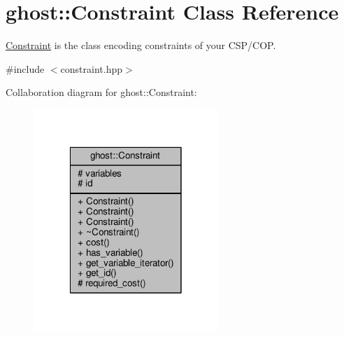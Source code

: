 \hypertarget{classghost_1_1Constraint}{\section{ghost\-:\-:Constraint Class Reference}
\label{classghost_1_1Constraint}
}


\hyperlink{classghost_1_1Constraint}{Constraint} is the class encoding constraints of your C\-S\-P/\-C\-O\-P.  




{\ttfamily \#include $<$constraint.\-hpp$>$}



Collaboration diagram for ghost\-:\-:Constraint\-:\nopagebreak
\begin{figure}[H]
\begin{center}
\leavevmode
\includegraphics[width=198pt]{classghost_1_1Constraint__coll__graph}
\end{center}
\end{figure}
